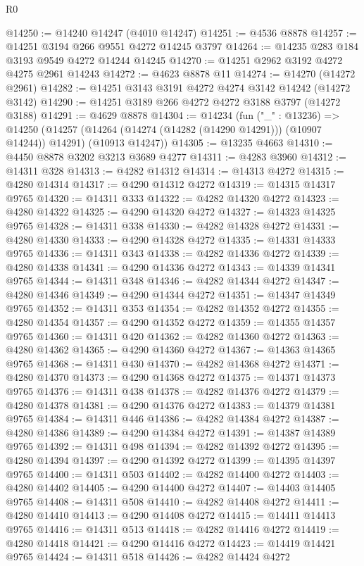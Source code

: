 \begin{lexlean}{R0}
\begin{coremodule}
@14250 := @14240 @14247 (@4010 @14247)
@14251 := @4536 @8878
@14257 := @14251 @3194 @266 @9551 @4272 @14245 @3797
@14264 := @14235 @283 @184 @3193 @9549 @4272 @14244 @14245
@14270 := @14251 @2962 @3192 @4272 @4275 @2961 @14243
@14272 := @4623 @8878 @11
@14274 := @14270 (@14272 @2961)
@14282 := @14251 @3143 @3191 @4272 @4274 @3142 @14242 (@14272 @3142)
@14290 := @14251 @3189 @266 @4272 @4272 @3188 @3797 (@14272 @3188)
@14291 := @4629 @8878
@14304 := @14234
    (fun ("_" : @13236) =>
    @14250
      (@14257 (@14264 (@14274 (@14282 (@14290 @14291))) (@10907 @14244)) @14291)
      (@10913 @14247))
@14305 := @13235 @4663
@14310 := @4450 @8878 @3202 @3213 @3689 @4277
@14311 := @4283 @3960
@14312 := @14311 @328
@14313 := @4282 @14312
@14314 := @14313 @4272
@14315 := @4280 @14314
@14317 := @4290 @14312 @4272
@14319 := @14315 @14317 @9765
@14320 := @14311 @333
@14322 := @4282 @14320 @4272
@14323 := @4280 @14322
@14325 := @4290 @14320 @4272
@14327 := @14323 @14325 @9765
@14328 := @14311 @338
@14330 := @4282 @14328 @4272
@14331 := @4280 @14330
@14333 := @4290 @14328 @4272
@14335 := @14331 @14333 @9765
@14336 := @14311 @343
@14338 := @4282 @14336 @4272
@14339 := @4280 @14338
@14341 := @4290 @14336 @4272
@14343 := @14339 @14341 @9765
@14344 := @14311 @348
@14346 := @4282 @14344 @4272
@14347 := @4280 @14346
@14349 := @4290 @14344 @4272
@14351 := @14347 @14349 @9765
@14352 := @14311 @353
@14354 := @4282 @14352 @4272
@14355 := @4280 @14354
@14357 := @4290 @14352 @4272
@14359 := @14355 @14357 @9765
@14360 := @14311 @420
@14362 := @4282 @14360 @4272
@14363 := @4280 @14362
@14365 := @4290 @14360 @4272
@14367 := @14363 @14365 @9765
@14368 := @14311 @430
@14370 := @4282 @14368 @4272
@14371 := @4280 @14370
@14373 := @4290 @14368 @4272
@14375 := @14371 @14373 @9765
@14376 := @14311 @438
@14378 := @4282 @14376 @4272
@14379 := @4280 @14378
@14381 := @4290 @14376 @4272
@14383 := @14379 @14381 @9765
@14384 := @14311 @446
@14386 := @4282 @14384 @4272
@14387 := @4280 @14386
@14389 := @4290 @14384 @4272
@14391 := @14387 @14389 @9765
@14392 := @14311 @498
@14394 := @4282 @14392 @4272
@14395 := @4280 @14394
@14397 := @4290 @14392 @4272
@14399 := @14395 @14397 @9765
@14400 := @14311 @503
@14402 := @4282 @14400 @4272
@14403 := @4280 @14402
@14405 := @4290 @14400 @4272
@14407 := @14403 @14405 @9765
@14408 := @14311 @508
@14410 := @4282 @14408 @4272
@14411 := @4280 @14410
@14413 := @4290 @14408 @4272
@14415 := @14411 @14413 @9765
@14416 := @14311 @513
@14418 := @4282 @14416 @4272
@14419 := @4280 @14418
@14421 := @4290 @14416 @4272
@14423 := @14419 @14421 @9765
@14424 := @14311 @518
@14426 := @4282 @14424 @4272

\end{coremodule}
\end{lexlean}
